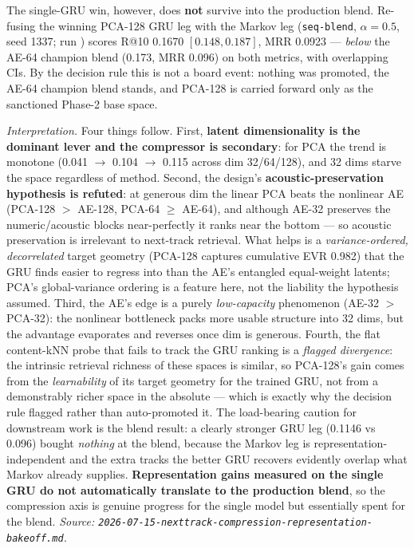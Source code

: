 \documentclass[11pt]{article}
\newcommand{\runid}[1]{\texttt{\small\seqsplit{#1}}}
\begin{document}
The single-GRU win, however, does \textbf{not} survive into the production
blend. Re-fusing the winning PCA-128 GRU leg with the Markov leg
(\texttt{seq-blend}, $\alpha{=}0.5$, seed 1337;
run \runid{run-20260715-044920-36dce}) scores R@10 \num{0.1670}
$[0.148, 0.187]$, MRR \num{0.0923} --- \emph{below} the AE-64 champion blend
(\num{0.173}, MRR \num{0.096}) on both metrics, with overlapping CIs. By the
decision rule this is not a board event: nothing was promoted, the AE-64
champion blend stands, and PCA-128 is carried forward only as the sanctioned
Phase-2 base space.

\emph{Interpretation.} Four things follow. First, \textbf{latent dimensionality
is the dominant lever and the compressor is secondary}: for PCA the trend is
monotone (\num{0.041} $\to$ \num{0.104} $\to$ \num{0.115} across dim 32/64/128),
and 32 dims starve the space regardless of method. Second, the design's
\textbf{acoustic-preservation hypothesis is refuted}: at generous dim the linear
PCA beats the nonlinear AE (PCA-128 $>$ AE-128, PCA-64 $\ge$ AE-64), and although
AE-32 preserves the numeric/acoustic blocks near-perfectly it ranks near the
bottom --- so acoustic preservation is irrelevant to next-track retrieval. What
helps is a \emph{variance-ordered, decorrelated} target geometry (PCA-128
captures cumulative EVR \num{0.982}) that the GRU finds easier to regress into
than the AE's entangled equal-weight latents; PCA's global-variance ordering is
a feature here, not the liability the hypothesis assumed. Third, the AE's edge
is a purely \emph{low-capacity} phenomenon (AE-32 $>$ PCA-32): the nonlinear
bottleneck packs more usable structure into 32 dims, but the advantage
evaporates and reverses once dim is generous. Fourth, the flat content-kNN probe
that fails to track the GRU ranking is a \emph{flagged divergence}: the
intrinsic retrieval richness of these spaces is similar, so PCA-128's gain comes
from the \emph{learnability} of its target geometry for the trained GRU, not
from a demonstrably richer space in the absolute --- which is exactly why the
decision rule flagged rather than auto-promoted it. The load-bearing caution for
downstream work is the blend result: a clearly stronger GRU leg (\num{0.1146}
vs \num{0.096}) bought \emph{nothing} at the blend, because the Markov leg is
representation-independent and the extra tracks the better GRU recovers evidently
overlap what Markov already supplies. \textbf{Representation gains measured on
the single GRU do not automatically translate to the production blend}, so the
compression axis is genuine progress for the single model but essentially spent
for the blend. \emph{Source:
\texttt{2026-07-15-nexttrack-compression-representation-bakeoff.md}.}
\end{document}
